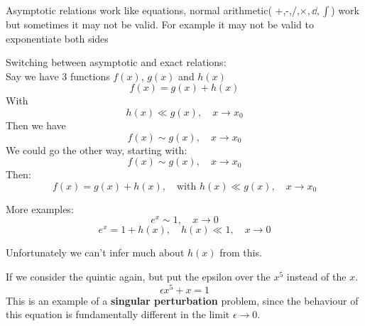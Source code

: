 \documentclass{/home/janmebows/Documents/LatexTemplates/myassignment}
\begin{document}
Asymptotic relations work like equations, normal arithmetic( +,-,/,$\times, \dd{}{},\int$) work but sometimes it may not be valid. For example it may not be valid to exponentiate both sides

Switching between asymptotic and exact relations:\\
Say we have 3 functions $f(x)$, $g(x)$ and $h(x)$
\[f(x) = g(x) + h(x)\]
With
\[h(x) \ll g(x), \quad x\to x_0\]
Then we have
\[f(x) \sim g(x), \quad x\to x_0\]
We could go the other way, starting with:
\[f(x) \sim g(x), \quad x\to x_0\]
Then:
\[f(x) = g(x) + h(x), \quad \text{with } h(x)\ll g(x), \quad x\to x_0\]


More examples:
\[e^x \sim 1, \quad x\to0\]
\[e^x = 1 + h(x), \quad h(x)\ll 1, \quad x\to0\]

Unfortunately we can't infer much about $h(x)$ from this.

If we consider the quintic again, but put the epsilon over the $x^5$ instead of the $x$.
\[\epsilon x^5 + x =1\]
This is an example of a \textbf{singular perturbation} problem, since the behaviour of this equation is fundamentally different in the limit $\epsilon\to 0$. 
\end{document}

